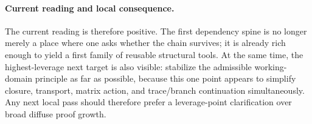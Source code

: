 \paragraph{Current reading and local consequence.}
The current reading is therefore positive. The first dependency spine is no longer merely a place where one asks whether the chain survives; it is already rich enough to yield a first family of reusable structural tools. At the same time, the highest-leverage next target is also visible: stabilize the admissible working-domain principle as far as possible, because this one point appears to simplify closure, transport, matrix action, and trace/branch continuation simultaneously. Any next local pass should therefore prefer a leverage-point clarification over broad diffuse proof growth.



